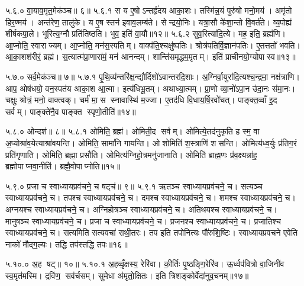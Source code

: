 ५.६.०
वा॒याव॒मृत॒मेक॑ञ्च॥ ६॥
५.६.१
स य ए॒षोऽन्तर्\mbox{}हृ॑दय आका॒शः। तस्मि॑न्न॒यं पुरु॑षो मनो॒मय॑। अमृ॑तो हिर॒ण्मय॑। अन्त॑रेण॒ तालु॑के। य ए॒ष स्तन॑ इवाव॒लम्ब॑ते। सेन्द्रयो॒निः। यत्रा॒सौ के॑शा॒न्तो वि॒वर्त॑ते। व्य॒पोह्य॑ शीर्\mbox{}षकपा॒ले। भूरित्य॒ग्नौ प्रति॑तिष्ठति। भुव॒ इति॑ वा॒यौ॥१२॥
५.६.२
सुव॒रित्या॑दि॒त्ये। मह॒ इति॒ ब्रह्म॑णि। आ॒प्नोति॒ स्वाराज्यम्। आ॒प्नोति॒ मन॑स॒स्पतिम्। वाक्प॑ति॒श्चक्षु॑ष्पतिः। श्रोत्र॑पतिर्वि॒ज्ञान॑पतिः। ए॒तत्ततो॑ भवति। आ॒का॒शश॑रीरं॒ ब्रह्म॑। स॒त्यात्म॑प्रा॒णारा॑मं॒ मन॑ आनन्दम्। शान्ति॑समृद्धम॒मृतम्। इति॑ प्राचीनयो॒ग्योपास्व॥१३॥
\anuvakamend

५.७.०
सर्व॒मेक॑ञ्च॥ ७॥
५.७.१
पृ॒थि॒व्य॑न्तरि॑क्ष॒न्द्यौर्दिशो॑ऽवान्तरदि॒शाः। अ॒ग्निर्वा॒युरा॑दि॒त्यश्च॒न्द्रमा॒ नक्ष॑त्राणि। आप॒ ओष॑धयो॒ वन॒स्पत॑य आका॒श आ॒त्मा। इत्य॑धिभू॒तम्। अथाध्या॒त्मम्। प्रा॒णो व्या॒नो॑ऽपा॒न उ॑दा॒नः स॑मा॒नः। चक्षुः॒ श्रोत्रं॒ मनो॒ वाक्त्वक्। चर्म॑ मा॒स स्नावास्थि॑ म॒ज्जा। ए॒तद॑धि वि॒धाय॒र्\mbox{}षि॒रवो॑चत्। पाङ्क्त॒व्वाँ इ॒द सर्वम्। पाङ्क्ते॑नै॒व पाङ्क्त स्पृणो॒तीति॑॥१४॥
\anuvakamend

५.८.०
ओन्दश॑॥ ८॥
५.८.१
ओमिति॒ ब्रह्म॑। ओमिती॒द सर्वम्। ओमित्ये॒तद॑नुकृति ह स्म॒ वा अ॒प्योश्रा॑व॒येत्याश्रा॑वयन्ति। ओमिति॒ सामा॑नि गायन्ति। ओशोमिति॑ श॒स्त्राणि॑ शसन्ति। ओमित्य॑ध्व॒र्युः प्र॑तिग॒रं प्रति॑गृणाति। ओमिति॒ ब्रह्मा॒ प्रसौ॑ति। ओमित्य॑ग्निहो॒त्रमनु॑जानाति। ओमिति॑ ब्राह्म॒णः प्र॑व॒क्ष्यन्ना॑ह॒ ब्रह्मोपाप्नवा॒नीति॑। ब्रह्मै॒वोपाप्नोति॥१५॥
\anuvakamend

५.९.०
प्रजा च स्वाध्यायप्रव॑चने॒ च षट्च॑॥ ९॥
५.९.१
ऋतञ्च स्वाध्यायप्रव॑चने॒ च। सत्यञ्च स्वाध्यायप्रव॑चने॒ च। तपश्च स्वाध्यायप्रव॑चने॒ च। दमश्च स्वाध्यायप्रव॑चने॒ च। शमश्च स्वाध्यायप्रव॑चने॒ च। अग्नयश्च स्वाध्यायप्रव॑चने॒ च। अग्निहोत्रञ्च स्वाध्यायप्रव॑चने॒ च। अतिथयश्च स्वाध्यायप्रव॑चने॒ च। मानुषञ्च स्वाध्यायप्रव॑चने॒ च। प्रजा च स्वाध्यायप्रव॑चने॒ च। प्रजनश्च स्वाध्यायप्रव॑चने॒ च। प्रजातिश्च स्वाध्यायप्रव॑चने॒ च। सत्यमिति सत्यवचा॑ राथी॒तरः। तप इति तपोनित्यः पौ॑रुशि॒ष्टिः। स्वाध्यायप्रवचने एवेति नाको॑ मौद्ग॒ल्यः। तद्धि तप॑स्तद्धि॒ तपः॥१६॥
\anuvakamend

५.१०.०
अ॒ह षट्॥ १०॥
५.१०.१
अ॒हव्वृँ॒क्षस्य॒ रेरि॑वा। की॒र्तिः पृ॒ष्ठङ्गि॒रेरि॑व। ऊ॒र्ध्वप॑वित्रो वा॒जिनी॑व स्व॒मृत॑मस्मि। द्रवि॑ण॒ सव॑र्चसम्। सुमेधा अ॑मृतो॒क्षितः। इति त्रिशङ्कोर्वेदा॑नुव॒चनम्॥१७॥
\anuvakamend

